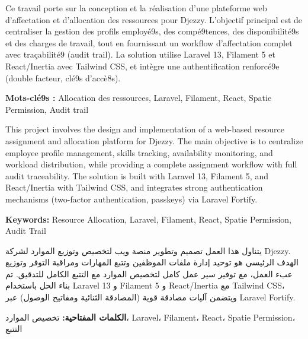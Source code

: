 \documentclass{bts-report}
\begin{document}
\begin{abstractfr}
Ce travail porte sur la conception et la r\'ealisation d'une plateforme web d'affectation et d'allocation des ressources pour Djezzy. L'objectif principal est de centraliser la gestion des profils employ\'e9s, des comp\'e9tences, des disponibilit\'e9s et des charges de travail, tout en fournissant un workflow d'affectation complet avec tra\c{c}abilit\'e9 (audit trail). La solution utilise Laravel 13, Filament 5 et React/Inertia avec Tailwind CSS, et int\`egre une authentification renforc\'e9e (double facteur, cl\'e9s d'acc\`e8s).

\medskip
\noindent\textbf{Mots-cl\'e9s :} Allocation des ressources, Laravel, Filament, React, Spatie Permission, Audit trail
\end{abstractfr}

\begin{abstracten}
This project involves the design and implementation of a web-based resource assignment and allocation platform for Djezzy. The main objective is to centralize employee profile management, skills tracking, availability monitoring, and workload distribution, while providing a complete assignment workflow with full audit traceability. The solution is built with Laravel 13, Filament 5, and React/Inertia with Tailwind CSS, and integrates strong authentication mechanisms (two-factor authentication, passkeys) via Laravel Fortify.

\medskip
\noindent\textbf{Keywords:} Resource Allocation, Laravel, Filament, React, Spatie Permission, Audit Trail
\end{abstracten}

\begin{abstractar}
يتناول هذا العمل تصميم وتطوير منصة ويب لتخصيص وتوزيع الموارد لشركة Djezzy. الهدف الرئيسي هو توحيد إدارة ملفات الموظفين وتتبع المهارات ومراقبة التوفر وتوزيع عبء العمل، مع توفير سير عمل كامل لتخصيص الموارد مع التتبع الكامل للتدقيق. تم بناء الحل باستخدام Laravel 13 و Filament 5 و React/Inertia مع Tailwind CSS، ويتضمن آليات مصادقة قوية (المصادقة الثنائية ومفاتيح الوصول) عبر Laravel Fortify.

\medskip
\noindent\textbf{الكلمات المفتاحية:} تخصيص الموارد، Laravel، Filament، React، Spatie Permission، التتبع
\end{abstractar}

\tableofcontents

\setlength{\parskip}{6pt}
\setlength{\parindent}{1em}
\end{document}
